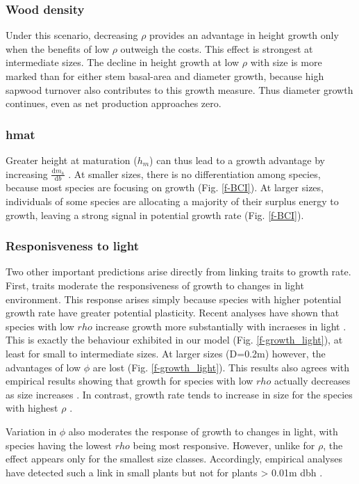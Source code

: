 \documentclass[12pt, a4paper]{article}
\begin{document}
\subsubsection{Wood density}

Under this scenario, decreasing $\rho$ provides an advantage in height
growth only when the benefits of low $\rho$ outweigh the costs. This
effect is strongest at intermediate sizes. The decline in height growth
at low $\rho$ with size is more marked than for either stem basal-area
and diameter growth, because high sapwood turnover also contributes to
this growth measure. Thus diameter growth continues, even as net
production approaches zero.

\subsubsection{hmat}

 Greater height at maturation ($h_m$)
can thus lead to a growth advantage by increasing
$\frac{\textrm{d}m_\textrm{a}}{\textrm{d}b}$ . At smaller sizes, there is no differentiation
among species, because most species are focusing on growth (Fig.
\ref{f-BCI}). At larger sizes, individuals of some species are
allocating a majority of their surplus energy to growth, leaving a
strong signal in potential growth rate (Fig. \ref{f-BCI}).


\subsubsection{Responisveness to light}

Two other important predictions arise directly from linking traits to
growth rate. First, traits moderate the
responsiveness of growth to changes in light environment. This response
arises simply because species with higher potential growth rate have
greater potential plasticity. Recent analyses have shown that species
with low $rho$ increase growth more substantially with incraeses in
light \citep{ruger-2012}. This is exactly the behaviour
exhibited in our model (Fig. \ref{f-growth_light}), at least for small
to intermediate sizes. At larger sizes (D=0.2m) however, the advantages
of low $\phi$ are lost (Fig. \ref{f-growth_light}). This results also
agrees with empirical results showing that growth for species with low
$rho$ actually decreases as size
increases \citep{ruger-2012}. In contrast, growth rate tends
to increase in size for the species with highest
$\rho$ \citep{ruger-2012}.


Variation in $\phi$ also moderates the response of growth to changes
in light, with species having the lowest $rho$ being most responsive.
However, unlike for $\rho$, the effect appears only for the smallest
size classes. Accordingly, empirical analyses have detected such a link
in small plants but not for plants \textgreater{} 0.01m
dbh \citep{ruger-2012}.
\end{document}
